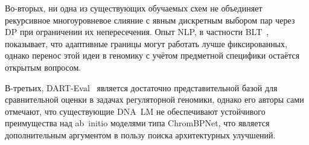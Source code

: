 Во-вторых, ни одна из существующих обучаемых схем не объединяет
рекурсивное многоуровневое слияние с явным дискретным выбором пар через
DP при ограничении их непересечения. Опыт NLP, в частности
BLT~\cite{bltByteLatentTransformer2024}, показывает, что адаптивные
границы могут работать лучше фиксированных, однако перенос этой идеи
в геномику с учётом предметной специфики остаётся открытым вопросом.

В-третьих, DART-Eval~\cite{patel2025dartevalcomprehensivednalanguage}
является достаточно представительной базой для сравнительной оценки в
задачах регуляторной геномики, однако его авторы сами отмечают, что
существующие DNA~LM не обеспечивают устойчивого преимущества над
ab~initio моделями типа ChromBPNet, что является дополнительным
аргументом в пользу поиска архитектурных улучшений.

